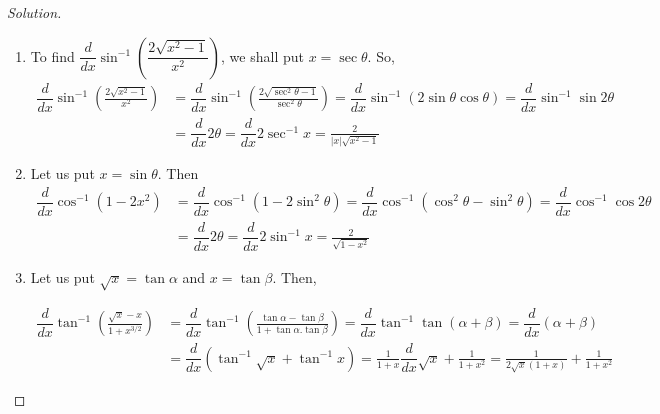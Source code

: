 \documentclass[../../main.tex]{subfiles}
\theoremstyle{definition}
\newenvironment{solution}
    {\begin{proof}[Solution]}
    {\end{proof}}
\begin{document}
\begin{solution}
\begin{enumerate}[label=(\roman*)]
\item To find $\dfrac{d}{dx} \sin^{-1} (\dfrac{2\sqrt{x^2-1}}{x^2})$, we shall put $x=\sec \theta$. So,
\begin{align*}
    \dfrac{d}{dx} \sin^{-1} \left(\frac{2\sqrt{x^2-1}}{x^2}\right) &= \dfrac{d}{dx} \sin^{-1} \left(\frac{2\sqrt{\sec^2\theta-1}}{\sec^2\theta}\right) = \dfrac{d}{dx}\sin^{-1}(2\sin \theta \cos \theta) = \dfrac{d}{dx}\sin ^{-1}\sin 2\theta \\
    &= \dfrac{d}{dx}2\theta = \dfrac{d}{dx}2\sec^{-1}x = \frac{2}{|x|\sqrt{x^2-1}}
\end{align*}

\item Let us put $x=\sin \theta$. Then
\begin{align*}
\dfrac{d}{dx} \cos^{-1} (1-2x^2) &= \dfrac{d}{dx} \cos^{-1} (1-2\sin ^2\theta) = \dfrac{d}{dx} \cos^{-1} (\cos^2\theta-\sin^2\theta) = \dfrac{d}{dx}\cos^{-1}\cos 2\theta \\ 
&= \dfrac{d}{dx}2\theta = \dfrac{d}{dx}2\sin^{-1}x = \frac{2}{\sqrt{1-x^2}}
\end{align*}

\item Let us put $\sqrt{x}=\tan \alpha$ and $x=\tan \beta$. Then,

\begin{align*}
\dfrac{d}{dx} \tan^{-1} \left(\frac{\sqrt{x}-x}{1+x^{3/2}}\right) &= \dfrac{d}{dx} \tan^{-1} \left(\frac{\tan \alpha-\tan \beta}{1+\tan \alpha.\tan \beta}\right) = \dfrac{d}{dx} \tan^{-1}\tan (\alpha+\beta) = \dfrac{d}{dx}(\alpha+\beta) \\
&= \dfrac{d}{dx}(\tan ^{-1}\sqrt{x}+\tan^{-1}x) = \frac{1}{1+x}\dfrac{d}{dx}\sqrt{x} +\frac{1}{1+x^2} = \frac{1}{2\sqrt{x}(1+x)} + \frac{1}{1+x^2}
\end{align*}
\end{enumerate}
\end{solution}
\end{document}
